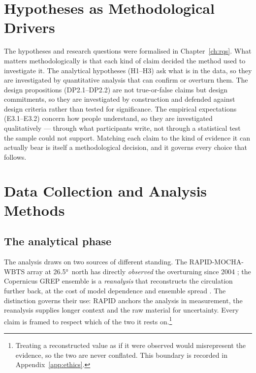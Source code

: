 \section{Hypotheses as Methodological Drivers}
\label{sec:hypotheses-drivers}

The hypotheses and research questions were formalised in Chapter~\ref{ch:rqs}. What matters methodologically is that each kind of claim decided the method used to investigate it. The analytical hypotheses (H1--H3) ask what is in the data, so they are investigated by quantitative analysis that can confirm or overturn them. The design propositions (DP2.1--DP2.2) are not true-or-false claims but design commitments, so they are investigated by construction and defended against design criteria rather than tested for significance. The empirical expectations (E3.1--E3.2) concern how people understand, so they are investigated qualitatively --- through what participants write, not through a statistical test the sample could not support. Matching each claim to the kind of evidence it can actually bear is itself a methodological decision, and it governs every choice that follows.

\section{Data Collection and Analysis Methods}
\label{sec:data-methods}

\subsection{The analytical phase}
\label{subsec:analytical}

The analysis draws on two sources of different standing. The RAPID-MOCHA-WBTS array at \ang{26.5}~north has directly \emph{observed} the overturning since 2004 \citep{frajkawilliams2021, moat2026}; the Copernicus GREP ensemble is a \emph{reanalysis} that reconstructs the circulation further back, at the cost of model dependence and ensemble spread \citep{copernicus_grep}. The distinction governs their use: RAPID anchors the analysis in measurement, the reanalysis supplies longer context and the raw material for uncertainty. Every claim is framed to respect which of the two it rests on.\footnote{Treating a reconstructed value as if it were observed would misrepresent the evidence, so the two are never conflated. This boundary is recorded in Appendix~\ref{app:ethics}.}

